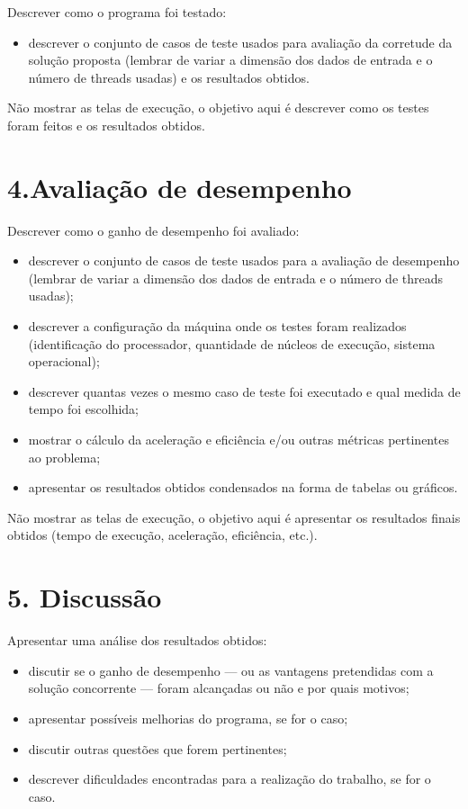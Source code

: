 \documentclass{article}
\begin{document}
Descrever como o programa foi testado:

\begin{itemize}
    \item descrever o conjunto de casos de teste usados para avaliação da corretude da
    solução proposta (lembrar de variar a dimensão dos dados de entrada e o número
    de threads usadas) e os resultados obtidos.
\end{itemize}

Não mostrar as telas de execução, o objetivo aqui é descrever como os testes foram
feitos e os resultados obtidos.

\section*{4.Avaliação de desempenho}

Descrever como o ganho de desempenho foi avaliado:

\begin{itemize}
    \item descrever o conjunto de casos de teste usados para a avaliação de desempenho
    (lembrar de variar a dimensão dos dados de entrada e o número de threads usadas);
    \item descrever a configuração da máquina onde os testes foram realizados (identificação
    do processador, quantidade de núcleos de execução, sistema operacional);
    \item descrever quantas vezes o mesmo caso de teste foi executado e qual medida de
    tempo foi escolhida;
    \item mostrar o cálculo da aceleração e eficiência e/ou outras métricas pertinentes ao
    problema;
    \item apresentar os resultados obtidos condensados na forma de tabelas ou gráficos.
\end{itemize}

Não mostrar as telas de execução, o objetivo aqui é apresentar os resultados finais
obtidos (tempo de execução, aceleração, eficiência, etc.).

\section*{5. Discussão}

Apresentar uma análise dos resultados obtidos:

\begin{itemize}
    \item discutir se o ganho de desempenho — ou as vantagens pretendidas com a solução
    concorrente — foram alcançadas ou não e por quais motivos;
    \item apresentar possíveis melhorias do programa, se for o caso;
    \item discutir outras questões que forem pertinentes;
    \item descrever dificuldades encontradas para a realização do trabalho, se for o caso.
\end{itemize}
\end{document}
